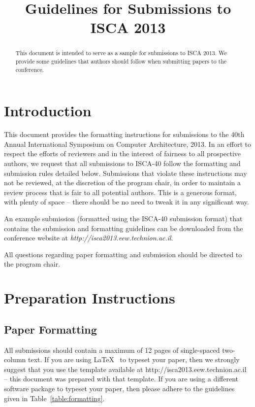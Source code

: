\documentclass[pageno]{jpaper}
\begin{document}
\title{
Guidelines for Submissions to ISCA 2013}

\date{}
\maketitle

\thispagestyle{empty}

\begin{abstract}
This document is intended to serve as a sample for submissions to ISCA 2013.
We provide some guidelines that authors should follow when submitting papers to
the conference.
\end{abstract}

\section{Introduction}

This document provides the formatting instructions for submissions to the 40th
Annual International Symposium on Computer Architecture,
2013. In an effort to respect the efforts of reviewers and in
the interest of fairness to all prospective authors, we request that all
submissions to ISCA-40 follow the formatting and submission rules detailed
below.  Submissions that violate these instructions may not be
reviewed, at the discretion of the program chair, in order to maintain a review
process that is fair to all potential authors.  This is a generous format,
with plenty of space -- there should be no need to tweak it in any
significant way.

An example submission (formatted using the ISCA-40 submission format) that
contains the submission and formatting guidelines can be downloaded from
the conference website at {\em http://isca2013.eew.technion.ac.il}.

All questions regarding paper formatting and submission should be directed to
the program chair.

\section{Preparation Instructions}

\subsection{Paper Formatting}

All submissions should contain a maximum of 12 pages of single-spaced
two-column text. If you are using \LaTeX~\cite{lamport94} 
to typeset your paper, then we 
strongly suggest
that you use the template available at
http://isca2013.eew.technion.ac.il -- this
document was prepared with that template.  
If you are using a different
software package to typeset your paper, then please adhere to the guidelines
given in Table~\ref{table:formatting}.
\end{document}
